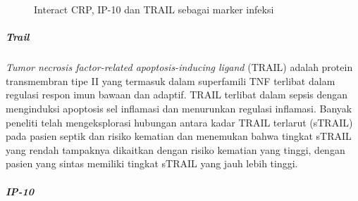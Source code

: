 \documentclass[
  10pt,
  letterpaper,
]{article}
\begin{document}
\begin{figure}


\caption{\label{fig-CRPIP10TRAIL}Interact CRP, IP-10 dan TRAIL sebagai
marker infeksi}

\end{figure}%

\subparagraph{Trail}\label{trail}

\emph{Tumor necrosis factor-related apoptosis-inducing ligand} (TRAIL)
adalah protein transmembran tipe II yang termasuk dalam superfamili TNF
terlibat dalam regulasi respon imun bawaan dan
adaptif.\citep{Gyurkovska2016} TRAIL terlibat dalam sepsis dengan
menginduksi apoptosis sel inflamasi dan menurunkan regulasi inflamasi.
Banyak peneliti telah mengeksplorasi hubungan antara kadar TRAIL
terlarut (sTRAIL) pada pasien septik dan risiko kematian dan menemukan
bahwa tingkat sTRAIL yang rendah tampaknya dikaitkan dengan risiko
kematian yang tinggi, dengan pasien yang sintas memiliki tingkat sTRAIL
yang jauh lebih
tinggi.\citep{Papan2023, Fröhlich2023, Ashkenazi-Hoffnung2018}

\subparagraph{IP-10}\label{ip-10}
\end{document}

